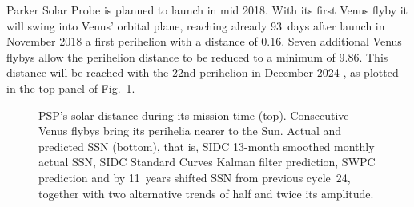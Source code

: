 Parker Solar Probe is planned to launch in mid 2018. With its first Venus flyby it will swing into Venus' orbital plane, reaching already 93~days after launch in November 2018 a first perihelion with a distance of \SI{0.16}{\au}. Seven additional Venus flybys allow the perihelion distance to be reduced to a minimum of \SI{9.86}{\Rs}. This distance will be reached with the 22nd perihelion in December 2024 \citep{Fox2015}, as plotted in the top panel of Fig.~\ref{fig:SPP_orbit_predicted_SSN_overview_f_plot}.
\begin{figure}
	\caption{PSP's solar distance during its mission time (top). Consecutive Venus flybys bring its perihelia nearer to the Sun. Actual and predicted SSN (bottom), that is, SIDC 13-month smoothed monthly actual SSN, SIDC Standard Curves Kalman filter prediction, SWPC prediction and by 11~years shifted SSN from previous cycle~24, together with two alternative trends of half and twice its amplitude.}
	\label{fig:SPP_orbit_predicted_SSN_overview_f_plot}
\end{figure}

